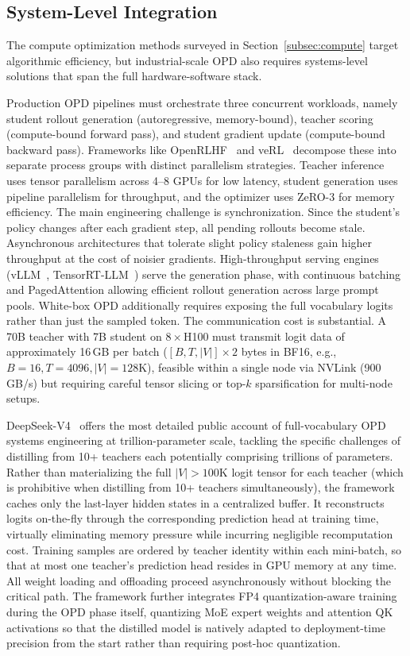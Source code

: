 \documentclass{article} %
\begin{document}
\subsection{System-Level Integration}
\label{subsec:systems}

The compute optimization methods surveyed in Section~\ref{subsec:compute} target algorithmic efficiency, but industrial-scale OPD also requires systems-level solutions that span the full hardware-software stack.

Production OPD pipelines must orchestrate three concurrent workloads, namely student rollout generation (autoregressive, memory-bound), teacher scoring (compute-bound forward pass), and student gradient update (compute-bound backward pass). Frameworks like OpenRLHF~\citep{hu2024openrlhf} and veRL~\citep{sheng2024verl} decompose these into separate process groups with distinct parallelism strategies. Teacher inference uses tensor parallelism across 4--8 GPUs for low latency, student generation uses pipeline parallelism for throughput, and the optimizer uses ZeRO-3 for memory efficiency. The main engineering challenge is synchronization. Since the student's policy changes after each gradient step, all pending rollouts become stale. Asynchronous architectures that tolerate slight policy staleness gain higher throughput at the cost of noisier gradients. High-throughput serving engines (vLLM~\citep{kwon2023vllm}, TensorRT-LLM~\citep{nvidia2024tensorrtllm}) serve the generation phase, with continuous batching and PagedAttention allowing efficient rollout generation across large prompt pools. White-box OPD additionally requires exposing the full vocabulary logits rather than just the sampled token. The communication cost is substantial. A 70B teacher with 7B student on $8\times$H100 must transmit logit data of approximately 16\,GB per batch ($[B, T, |V|] \times 2$ bytes in BF16, e.g., $B{=}16, T{=}4096, |V|{=}128$K), feasible within a single node via NVLink (900\,GB/s) but requiring careful tensor slicing or top-$k$ sparsification for multi-node setups.

DeepSeek-V4~\citep{deepseekv4} offers the most detailed public account of full-vocabulary OPD systems engineering at trillion-parameter scale, tackling the specific challenges of distilling from 10+ teachers each potentially comprising trillions of parameters. Rather than materializing the full $|V| > 100$K logit tensor for each teacher (which is prohibitive when distilling from 10+ teachers simultaneously), the framework caches only the last-layer hidden states in a centralized buffer. It reconstructs logits on-the-fly through the corresponding prediction head at training time, virtually eliminating memory pressure while incurring negligible recomputation cost. Training samples are ordered by teacher identity within each mini-batch, so that at most one teacher's prediction head resides in GPU memory at any time. All weight loading and offloading proceed asynchronously without blocking the critical path. The framework further integrates FP4 quantization-aware training during the OPD phase itself, quantizing MoE expert weights and attention QK activations so that the distilled model is natively adapted to deployment-time precision from the start rather than requiring post-hoc quantization.
\end{document}
